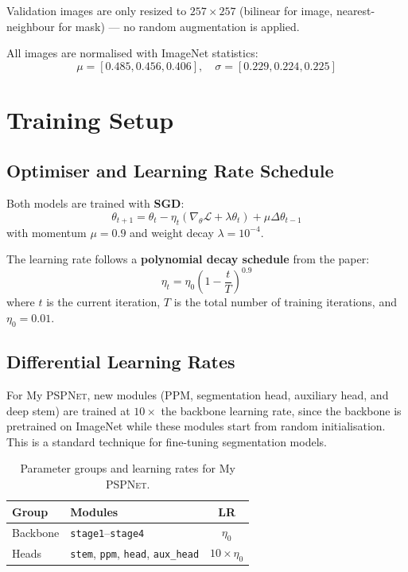 \documentclass[12pt,a4paper]{article}
\newcommand{\code}[1]{\texttt{#1}}
\newcommand{\pspnet}{\textsc{PSPNet}}
\newcommand{\mypsp}{My \pspnet{}}
\begin{document}
Validation images are only resized to $257\times257$ (bilinear for image,
nearest-neighbour for mask) — no random augmentation is applied.

All images are normalised with ImageNet statistics:
\[
    \mu = [0.485, 0.456, 0.406], \quad \sigma = [0.229, 0.224, 0.225]
\]

\section{Training Setup}

\subsection{Optimiser and Learning Rate Schedule}

Both models are trained with \textbf{SGD}:
\[
    \theta_{t+1} = \theta_t - \eta_t \left( \nabla_\theta \mathcal{L} + \lambda \theta_t \right) + \mu \Delta\theta_{t-1}
\]
with momentum $\mu = 0.9$ and weight decay $\lambda = 10^{-4}$.

The learning rate follows a \textbf{polynomial decay schedule} from the paper:
\[
    \eta_t = \eta_0 \left(1 - \frac{t}{T}\right)^{0.9}
\]
where $t$ is the current iteration, $T$ is the total number of training
iterations, and $\eta_0 = 0.01$.

\subsection{Differential Learning Rates}

For \mypsp{}, new modules (PPM, segmentation head, auxiliary head, and deep
stem) are trained at $10\times$ the backbone learning rate, since the backbone
is pretrained on ImageNet while these modules start from random
initialisation.  This is a standard technique for fine-tuning segmentation
models.

\begin{table}[H]
\centering
\caption{Parameter groups and learning rates for \mypsp{}.}
\label{tab:lr_groups}
\begin{tabular}{llc}
\toprule
\textbf{Group} & \textbf{Modules} & \textbf{LR} \\
\midrule
Backbone & \code{stage1}--\code{stage4} & $\eta_0$ \\
Heads    & \code{stem}, \code{ppm}, \code{head}, \code{aux\_head} & $10 \times \eta_0$ \\
\bottomrule
\end{tabular}
\end{table}
\end{document}
